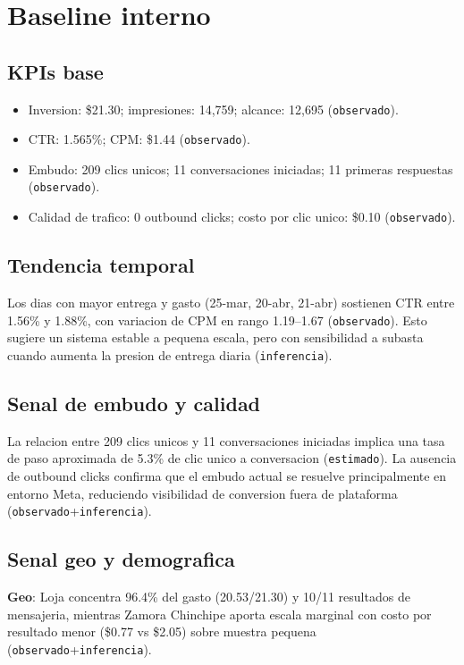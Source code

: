 \documentclass[9pt,a4paper,twocolumn,twoside]{tau-class/tau}
\begin{document}
\section{Baseline interno}

\subsection{KPIs base}
\begin{itemize}
  \item Inversion: \$21.30; impresiones: 14{,}759; alcance: 12{,}695 (\texttt{observado}).
  \item CTR: 1.565\%; CPM: \$1.44 (\texttt{observado}).
  \item Embudo: 209 clics unicos; 11 conversaciones iniciadas; 11 primeras respuestas (\texttt{observado}).
  \item Calidad de trafico: 0 outbound clicks; costo por clic unico: \$0.10 (\texttt{observado}).
\end{itemize}

\subsection{Tendencia temporal}
Los dias con mayor entrega y gasto (25-mar, 20-abr, 21-abr) sostienen CTR entre 1.56\% y 1.88\%, con variacion de CPM en rango 1.19--1.67 (\texttt{observado}). Esto sugiere un sistema estable a pequena escala, pero con sensibilidad a subasta cuando aumenta la presion de entrega diaria (\texttt{inferencia}).

\subsection{Senal de embudo y calidad}
La relacion entre 209 clics unicos y 11 conversaciones iniciadas implica una tasa de paso aproximada de 5.3\% de clic unico a conversacion (\texttt{estimado}). La ausencia de outbound clicks confirma que el embudo actual se resuelve principalmente en entorno Meta, reduciendo visibilidad de conversion fuera de plataforma (\texttt{observado}+\texttt{inferencia}).

\subsection{Senal geo y demografica}
\textbf{Geo}: Loja concentra 96.4\% del gasto (20.53/21.30) y 10/11 resultados de mensajeria, mientras Zamora Chinchipe aporta escala marginal con costo por resultado menor (\$0.77 vs \$2.05) sobre muestra pequena (\texttt{observado}+\texttt{inferencia}).
\end{document}
